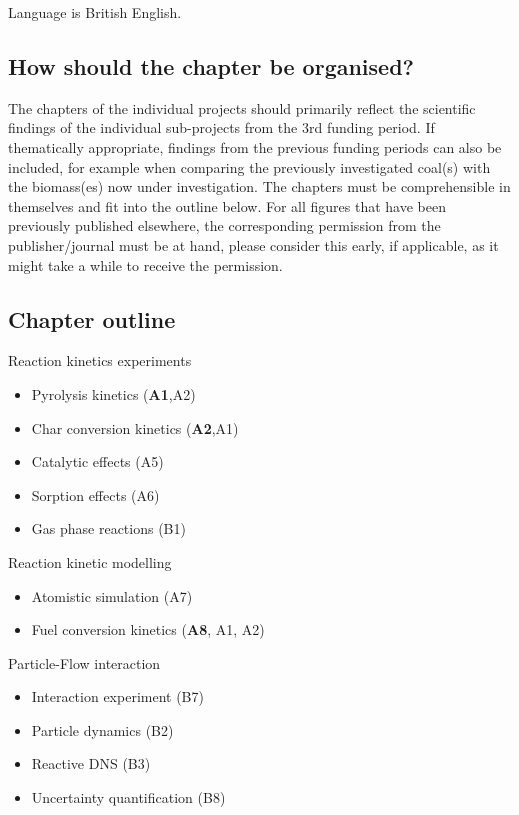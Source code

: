 \begin{btUnit}
Language is British English.

\subsection{How should the chapter be organised?}
The chapters of the individual projects should primarily reflect the scientific findings of the individual sub-projects from the 3rd funding period. If thematically appropriate, findings from the previous funding periods can also be included, for example when comparing the previously investigated coal(s) with the biomass(es) now under investigation. The chapters must be comprehensible in themselves and fit into the outline below. For all figures that have been previously published elsewhere, the corresponding permission from the publisher/journal must be at hand, please consider this early, if applicable, as it might take a while to receive the permission.
\newpage

\subsection{Chapter outline} \label{ex: chap Outline}


Reaction kinetics experiments
\begin{itemize}
	\item Pyrolysis kinetics (\textbf{A1},A2)
	\item Char conversion kinetics (\textbf{A2},A1)
	\item Catalytic effects (A5)    
	\item Sorption effects (A6)
	\item Gas phase reactions (B1)    	
\end{itemize}

Reaction kinetic modelling
\begin{itemize}
	\item Atomistic simulation (A7)    
	\item Fuel conversion kinetics (\textbf{A8}, A1, A2)
\end{itemize}

Particle-Flow interaction
\begin{itemize}
	\item Interaction experiment (B7)    
	\item Particle dynamics (B2)
	\item Reactive DNS (B3)	
	\item Uncertainty quantification (B8)	
\end{itemize}


\end{btUnit}
